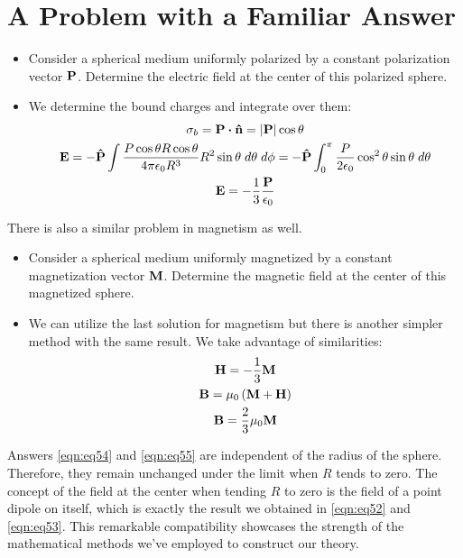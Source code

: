 \documentclass{article}
\numberwithin{equation}{section}
\begin{document}
\section{A Problem with a Familiar Answer}
\begin{itemize}
\item Consider a spherical medium uniformly polarized by a constant polarization vector $\vb{P}$. Determine the electric field at the center of this polarized sphere.
\item We determine the bound charges and integrate over them:
\begin{gather}
\sigma_b=\vb{P}\vdot\vu{n}=|\vb{P}|\cos\theta\nonumber\\\vb{E}=-\vu{P}\int\frac{P\cos\theta R\cos\theta}{4\pi\epsilon_0 R^3}R^2\sin\theta\;d\theta \;d\phi=-\vu{P}\int_0^\pi\frac{P}{2\epsilon_0}\cos^2\theta\sin\theta\;d\theta\nonumber\\\vb{E}=-\frac{1}{3}\frac{\vb{P}}{\epsilon_0}\label{eqn:eq54}
\end{gather}
\end{itemize}
There is also a similar problem in magnetism as well.
\begin{itemize}
\item Consider a spherical medium uniformly magnetized by a constant magnetization vector $\vb{M}$. Determine the magnetic field at the center of this magnetized sphere.
\item We can utilize the last solution for magnetism but there is another simpler method with the same result. We take advantage of similarities:
\begin{gather}
\vb{H}=-\frac{1}{3}\vb{M}\nonumber\\\vb{B}=\mu_0\left(\vb{M}+\vb{H}\right)\nonumber\\\vb{B}=\frac{2}{3}\mu_0\vb{M}\label{eqn:eq55}
\end{gather}
\end{itemize}
Answers \eqref{eqn:eq54} and \eqref{eqn:eq55} are independent of the radius of the sphere. Therefore, they remain unchanged under the limit when $R$ tends to zero. The concept of the field at the center when tending $R$ to zero is the field of a point dipole on itself, which is exactly the result we obtained in \eqref{eqn:eq52} and \eqref{eqn:eq53}. This remarkable compatibility showcases the strength of the mathematical methods we've employed to construct our theory.
\end{document}
